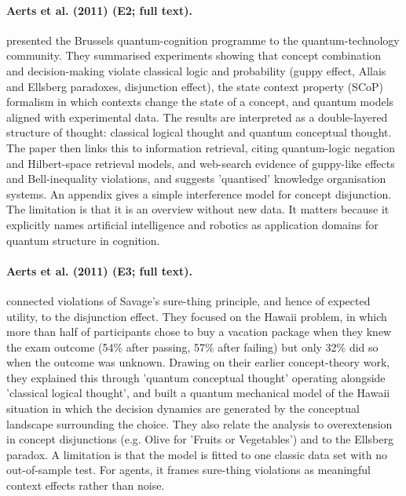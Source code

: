 \documentclass[10pt,a4paper]{article}
\begin{document}
\paragraph{Aerts et al. (2011) (E2; full text).} \citet{Aerts2011b} presented the Brussels quantum-cognition programme to the quantum-technology community. They summarised experiments showing that concept combination and decision-making violate classical logic and probability (guppy effect, Allais and Ellsberg paradoxes, disjunction effect), the state context property (SCoP) formalism in which contexts change the state of a concept, and quantum models aligned with experimental data. The results are interpreted as a double-layered structure of thought: classical logical thought and quantum conceptual thought. The paper then links this to information retrieval, citing quantum-logic negation and Hilbert-space retrieval models, and web-search evidence of guppy-like effects and Bell-inequality violations, and suggests 'quantised' knowledge organisation systems. An appendix gives a simple interference model for concept disjunction. The limitation is that it is an overview without new data. It matters because it explicitly names artificial intelligence and robotics as application domains for quantum structure in cognition.

\paragraph{Aerts et al. (2011) (E3; full text).} \citet{Aerts2011c} connected violations of Savage's sure-thing principle, and hence of expected utility, to the disjunction effect. They focused on the Hawaii problem, in which more than half of participants chose to buy a vacation package when they knew the exam outcome (54\% after passing, 57\% after failing) but only 32\% did so when the outcome was unknown. Drawing on their earlier concept-theory work, they explained this through 'quantum conceptual thought' operating alongside 'classical logical thought', and built a quantum mechanical model of the Hawaii situation in which the decision dynamics are generated by the conceptual landscape surrounding the choice. They also relate the analysis to overextension in concept disjunctions (e.g. Olive for 'Fruits or Vegetables') and to the Ellsberg paradox. A limitation is that the model is fitted to one classic data set with no out-of-sample test. For agents, it frames sure-thing violations as meaningful context effects rather than noise.
\end{document}
